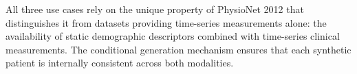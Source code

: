 \documentclass[12pt, a4paper]{article}
\begin{document}
\vspace{10pt}

\noindent All three use cases rely on the unique property of PhysioNet 2012
that distinguishes it from datasets providing time-series measurements alone:
the availability of static demographic descriptors combined with time-series
clinical measurements. The conditional generation mechanism ensures that each
synthetic patient is internally consistent across both modalities.
\end{document}
